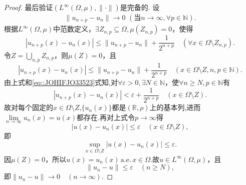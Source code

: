 \documentclass[../../main.tex]{subfiles}%
\begin{document}
\begin{proof}
最后验证$(L^\infty(\Omega,\mu),\|\cdot\|)$是完备的.
设
\begin{align}\label{eq::JOHIFJO33523}
\parallel u_{n+p}-u_n\parallel \rightarrow 0\,\,\left( \text{当}n\rightarrow \infty ,\forall p\in \mathbb{N} \right) .
\end{align}
根据$L^\infty(\Omega,\mu)$中范数定义，$\exists Z_{n,p} \subseteq \Omega, \mu(Z_{n,p}) = 0$，使得
$$|u_{n+p}(x)-u_n(x)| \leqslant \|u_{n+p}-u_n\| + \frac{1}{2^{n+p}} \quad (\forall x \in \Omega \setminus Z_{n,p}).$$
令$Z = \bigcup\limits_{n,p} Z_{n,p}$，则$\mu(Z)=0$，且
$$|u_{n+p}(x)-u_n(x)| \leqslant \|u_{n+p}-u_n\| + \frac{1}{2^{n+p}} \quad (x \in \Omega \setminus Z, n,p \in \mathbb{N}).$$
由上式和\eqref{eq::JOHIFJO33523}式知,对$\forall \varepsilon > 0, \exists N \in \mathbb{N}$，使$\forall n \geqslant N, p \in \mathbb{N}$有
$$|u_{n+p}(x)-u_n(x)| < \varepsilon + \frac{1}{2^{n+p}} \quad (x \in \Omega \setminus Z).$$
故对每个固定的$x \in \Omega \setminus Z$,$\{u_n(x)\}$都是$(\mathbb{R},\rho)$上的基本列,进而$\lim\limits_{n\to\infty} u_n(x) = u(x)$都存在.再对上式令$p \to \infty$得
$$|u(x)-u_n(x)| \leqslant \varepsilon \quad (x \in \Omega \setminus Z),$$
即
$$\sup\limits_{x \in \Omega \setminus Z} |u(x)-u_n(x)| \leqslant \varepsilon.$$
因$\mu(Z)=0$，所以$u(x)=u_n(x)\,\text{a.e.}\,x\in \Omega$.故$u \in L^\infty(\Omega,\mu)$，且
$$\|u_n - u\| \leqslant \varepsilon \quad (n \geqslant N),$$
即$\|u_n - u\| \to 0 \quad (n \to \infty).$
\end{proof}
\end{document}
